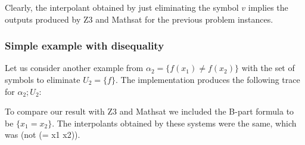 Clearly, the interpolant obtained by just eliminating the symbol $v$ implies
the outputs produced by Z3 and Mathsat for the previous problem instances.

\subsubsection{Simple example with disequality}

Let us consider another example from \cite{KAPUR2017} 
$\alpha_2 = \{f(x_1) \neq f(x_2)\}$
with the set of symbols to eliminate $U_2 = \{f\}$. The implementation produces the following
trace for $\alpha_2; U_2$:



To compare our result with Z3 and Mathsat we 
included the B-part formula to be $\{x_1 = x_2\}$.
The interpolants obtained by these systems were the 
same, which was (not (= x1 x2)).



